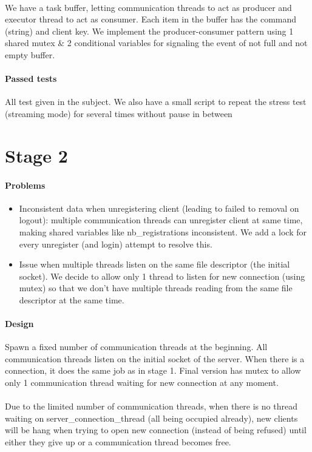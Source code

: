 \documentclass{article}
\begin{document}
\paragraph{} We have a task buffer, letting communication threads to act as producer and executor thread to act as consumer. Each item in the buffer has the command (string) and client key. We implement the producer-consumer pattern using 1 shared mutex \& 2 conditional variables for signaling the event of not full and not empty buffer.
\paragraph{Passed tests} All test given in the subject. We also have a small script to repeat the stress test (streaming mode) for several times without pause in between
\section{Stage 2}
\paragraph{Problems}
\begin{itemize}
\item Inconsistent data when unregistering client (leading to failed to removal on logout): multiple communication threads can unregister client at same time, making shared variables like nb\_registrations inconsistent. We add a lock for every unregister (and login) attempt to resolve this.
\item Issue when multiple threads listen on the same file descriptor (the initial socket). We decide to allow only 1 thread to listen for new connection (using mutex) so that we don't have multiple threads reading from the same file descriptor at the same time.
\end{itemize}

\paragraph{Design} Spawn a fixed number of communication threads at the beginning. All communication threads listen on the initial socket of the server. When there is a connection, it does the same job as in stage 1. Final version has mutex to allow only 1 communication thread waiting for new connection at any moment.
\paragraph{} Due to the limited number of communication threads, when there is no thread waiting on server\_connection\_thread (all being occupied already), new clients will be hang when trying to open new connection (instead of being refused) until either they give up or a communication thread becomes free.
\end{document}
